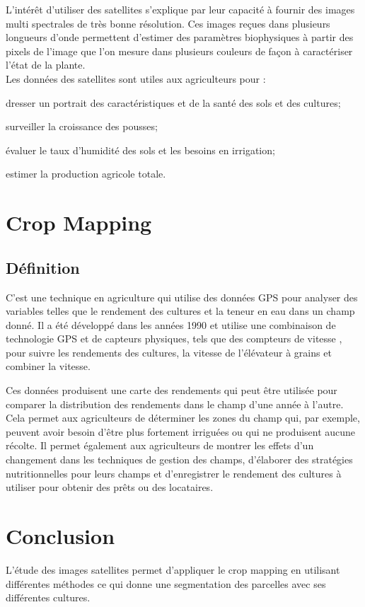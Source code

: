 \documentclass[12pt, openany]{report}
\begin{document}
L'intérêt d'utiliser des satellites s'explique par leur capacité à  fournir des images multi spectrales de très bonne résolution. Ces images reçues dans plusieurs longueurs d'onde permettent d'estimer des paramètres biophysiques à partir des pixels de l'image que l'on mesure dans plusieurs couleurs de façon à caractériser l'état de la plante.\\
Les données des satellites sont utiles aux agriculteurs pour :
\begin{mylist}
\item dresser un portrait des caractéristiques et de la santé des sols et des cultures;
\item surveiller la croissance des pousses;

\item évaluer le taux d'humidité des sols et les besoins en irrigation;
\item estimer la production agricole totale.
\end{mylist}

\section{Crop Mapping}
\subsection{Définition}
C’est une technique en agriculture qui utilise des données GPS pour analyser des variables telles que le rendement des cultures et la teneur en eau dans un champ donné. Il a été développé dans les années 1990 et utilise une combinaison de technologie GPS et de capteurs physiques, tels que des compteurs de vitesse , pour suivre les rendements des cultures, la vitesse de l'élévateur à grains et combiner la vitesse.
\par
Ces données produisent une carte des rendements qui peut être utilisée pour comparer la distribution des rendements dans le champ d'une année à l'autre. Cela permet aux agriculteurs de déterminer les zones du champ qui, par exemple, peuvent avoir besoin d'être plus fortement irriguées ou qui ne produisent aucune récolte. Il permet également aux agriculteurs de montrer les effets d'un changement dans les techniques de gestion des champs, d'élaborer des stratégies nutritionnelles pour leurs champs et d'enregistrer le rendement des cultures à utiliser pour obtenir des prêts ou des locataires.

\section*{Conclusion}
L'étude des images satellites permet d'appliquer le crop mapping en utilisant différentes méthodes ce qui donne une segmentation des parcelles avec ses différentes cultures.
\end{document}
